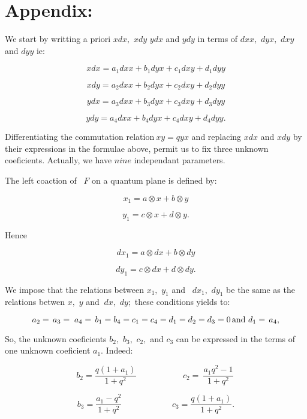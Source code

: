 \documentclass[a4paper,12pt,thmsa]{article}
\begin{document}
\newpage

\section*{Appendix:}

We start by writting a priori $xdx,$ $xdy$ $ydx$ and $ydy$ in terms of $dxx,$
$dyx,$ $dxy$ and $dyy$ ie:

\begin{equation}
xdx=a_1dxx+b_1dyx+c_1dxy+d_1dyy
\end{equation}

\begin{equation}
xdy=a_2dxx+b_2dyx+c_2dxy+d_2dyy
\end{equation}

\begin{equation}
ydx=a_3dxx+b_3dyx+c_3dxy+d_3dyy
\end{equation}

\begin{equation}
ydy=a_4dxx+b_4dyx+c_4dxy+d_4dyy .
\end{equation}

Differentiating the commutation relation$\ xy=qyx$ and replacing $xdx$ and $%
xdy$ by their expressions in the formulae above, permit us to fix three
unknown coeficients. Actually, we have $nine$ independant parameters.

The left coaction of \ $F$ on a quantum plane is defined by:

\[
x_{1}=a\otimes x+b\otimes y
\]

\[
y_1=c\otimes x+d\otimes y.
\]

Hence

\[
dx_{1}=a\otimes dx+b\otimes dy
\]

\[
dy_{1}=c\otimes dx+d\otimes dy.
\]

We impose that the relations between $x_1,$ $y_1$ and \ $dx_1,$ $dy_1$ be
the same as the relations betwen $x,$ $y$ and $\ dx,$ $dy;$ these conditions
yields to:

\[
a_{2}=\, a_{3}=\; a_{4}=\, %
b_{1}=b_{4}=c_{1}=c_{4}=d_{1}=d_{2}=d_{3}=0\, \hbox{and }d_{1}=\,
a_{4},
\]

So, the unknown coeficients $b_2,$ $b_3,$ $c_2,$ and $c_3$ can be expressed
in the terms of one unknown coeficient $a_1$. Indeed:

\[
b_{2}=\frac{q(1+a_{1})}{1+q^{2}}\ \ \ \ \ \ \ \ \ \ \ \ \ \ \ \ \ \ \ \ \ \
\ \ \ c_{2}=\ \frac{a_{1}q^{2}-1}{1+q^{2}}\
\]

\[
b_{3}=\frac{a_{1}-q^{2}}{1+q^{2}}\ \ \ \ \ \ \ \ \ \ \ \ \ \ \ \ \ \ \ \ \ \
\ \ \ \ \ c_{3}=\frac{q(1+a_{1})}{1+q^{2}}.
\]
\end{document}
